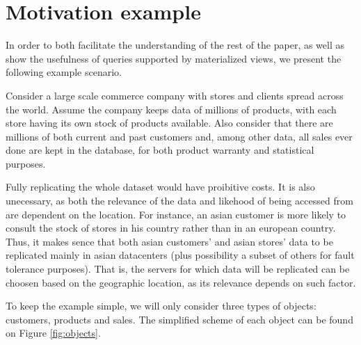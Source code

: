 \documentclass{vldb}
\begin{document}

\section{Motivation example}
\label{sec:example}


In order to both facilitate the understanding of the rest of the paper, as well as show the usefulness of queries supported by materialized views, we present the following example scenario.

Consider a large scale commerce company with stores and clients spread across the world.
Assume the company keeps data of millions of products, with each store having its own stock of products available.
Also consider that there are millions of both current and past customers and, among other data, all sales ever done are kept in the database, for both product warranty and statistical purposes.

Fully replicating the whole dataset would have proibitive costs.
It is also unecessary, as both the relevance of the data and likehood of being accessed from are dependent on the location.
For instance, an asian customer is more likely to consult the stock of stores in his country rather than in an european country.
Thus, it makes sence that both asian customers' and asian stores' data to be replicated mainly in asian datacenters (plus possibility a subset of others for fault tolerance purposes).
That is, the servers for which data will be replicated can be choosen based on the geographic location, as its relevance depends on such factor.

To keep the example simple, we will only consider three types of objects: customers, products and sales.
The simplified scheme of each object can be found on Figure \ref{fig:objects}.
\end{document}
